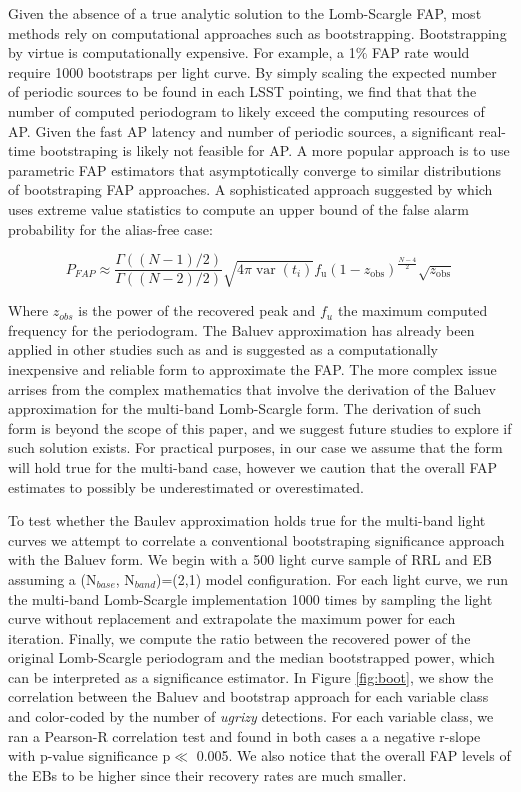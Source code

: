 \documentclass[DM,authoryear,toc]{lsstdoc}
\begin{document}
Given the absence of a true analytic solution to the Lomb-Scargle FAP, most methods rely on computational approaches such as bootstrapping. Bootstrapping by virtue is computationally expensive. For example, a 1$\%$ FAP rate would require 1000 bootstraps per light curve. By simply scaling the expected number of periodic sources to be found in each LSST pointing, we find that that the number of computed periodogram to likely exceed the computing resources of AP. Given the fast AP latency and number of periodic sources, a significant real-time bootstraping is likely not feasible for AP. A more popular approach is to use parametric FAP estimators that asymptotically converge to similar distributions of bootstraping FAP approaches. A sophisticated approach suggested by \citet{Baluev:Baluev2008} which uses extreme value statistics to compute an upper bound of the false alarm probability for the alias-free case:

\begin{equation}
P_{FAP} \approx \frac{\Gamma((N-1) / 2)}{\Gamma((N-2) / 2)} \sqrt{4 \pi \operatorname{var}\left(t_i\right)} f_{\mathrm{u}}\left(1-z_{\mathrm{obs}}\right)^{\frac{N-4}{2}} \sqrt{z_{\mathrm{obs}}}
\end{equation}

Where $z_{obs}$ is the power of the recovered peak and $f_u$ the maximum computed frequency for the periodogram. The Baluev approximation has already been applied in other studies such as \citet{Suveges:Suveges15} and is suggested as a computationally inexpensive and reliable form to approximate the FAP. The more complex issue arrises from the complex mathematics that involve the derivation of the Baluev approximation for the multi-band Lomb-Scargle form. The derivation of such form is beyond the scope of this paper, and we suggest future studies to explore if such solution exists. For practical purposes, in our case we assume that the \citet{Baluev:Baluev2008}  form will hold true for the multi-band case, however we caution that the overall FAP estimates to possibly be underestimated or overestimated. 


To test whether the Baulev approximation holds true for the multi-band light curves we attempt to correlate a conventional bootstraping significance approach with the Baluev form. We begin with a 500 light curve sample of RRL and EB assuming a (N$_{base}$, N$_{band}$)=(2,1) model configuration. For each light curve, we run the multi-band Lomb-Scargle implementation 1000 times by sampling the light curve without replacement and extrapolate the maximum power for each iteration. Finally, we compute the ratio between the recovered power of the original Lomb-Scargle periodogram and the median bootstrapped power, which can be interpreted as a significance estimator. In Figure \ref{fig:boot}, we show the correlation between the Baluev and bootstrap approach for each variable class and color-coded by the number of \textit{ugrizy} detections. For each variable class, we ran a Pearson-R correlation test and found in both cases a a negative r-slope with p-value significance p$\ll$ 0.005. We also notice that the overall FAP levels of the EBs to be higher since their recovery rates are much smaller. 
\end{document}
